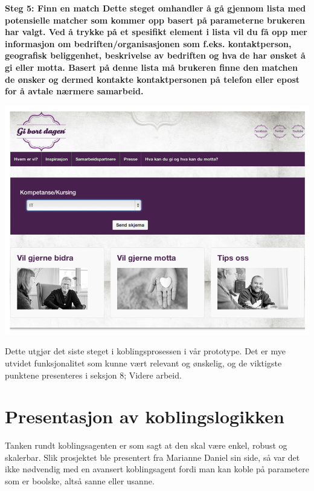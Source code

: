 \bf{Steg 5:} Finn en match
Dette steget omhandler å gå gjennom lista med potensielle matcher som kommer opp basert på parameterne brukeren har valgt. Ved å trykke på et spesifikt element i lista vil du få opp mer informasjon om bedriften/organisasjonen som f.eks. kontaktperson, geografisk beliggenhet, beskrivelse av bedriften og hva de har ønsket å gi eller motta. Basert på denne lista må brukeren finne den matchen de ønsker og dermed kontakte kontaktpersonen på telefon eller epost for å avtale nærmere samarbeid.\\
\begin{center}
\includegraphics[clip=true, width=1 \textwidth,
trim=0cm 0cm 0cm 0cm]{kompetanse.png}
\label{fig:match}
\end{center}

Dette utgjør det siste steget i koblingsprosessen i vår prototype. Det er mye utvidet funksjonalitet som kunne vært relevant og ønskelig, og de viktigste punktene presenteres i seksjon 8; Videre arbeid.\\

\section{Presentasjon av koblingslogikken}
Tanken rundt koblingsagenten er som sagt at den skal være enkel, robust og skalerbar. Slik prosjektet ble presentert fra Marianne Daniel sin side, så var det ikke nødvendig med en avansert koblingsagent fordi man kan koble på parametere som er boolske, altså sanne eller usanne.\\

